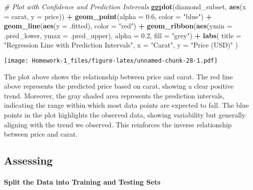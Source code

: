 \documentclass[
]{article}
\newenvironment{Shaded}{\begin{snugshade}}{\end{snugshade}}
\newcommand{\AttributeTok}[1]{\textcolor[rgb]{0.13,0.29,0.53}{#1}}
\newcommand{\CommentTok}[1]{\textcolor[rgb]{0.56,0.35,0.01}{\textit{#1}}}
\newcommand{\FloatTok}[1]{\textcolor[rgb]{0.00,0.00,0.81}{#1}}
\newcommand{\FunctionTok}[1]{\textcolor[rgb]{0.13,0.29,0.53}{\textbf{#1}}}
\newcommand{\NormalTok}[1]{#1}
\newcommand{\SpecialCharTok}[1]{\textcolor[rgb]{0.81,0.36,0.00}{\textbf{#1}}}
\newcommand{\StringTok}[1]{\textcolor[rgb]{0.31,0.60,0.02}{#1}}
\begin{document}
\begin{Shaded}
\begin{Highlighting}[]
\CommentTok{\# Plot with Confidence and Prediction Intervals}
\FunctionTok{ggplot}\NormalTok{(diamond\_subset, }\FunctionTok{aes}\NormalTok{(}\AttributeTok{x =}\NormalTok{ carat, }\AttributeTok{y =}\NormalTok{ price)) }\SpecialCharTok{+}
  \FunctionTok{geom\_point}\NormalTok{(}\AttributeTok{alpha =} \FloatTok{0.6}\NormalTok{, }\AttributeTok{color =} \StringTok{"blue"}\NormalTok{) }\SpecialCharTok{+}
  \FunctionTok{geom\_line}\NormalTok{(}\FunctionTok{aes}\NormalTok{(}\AttributeTok{y =}\NormalTok{ .fitted), }\AttributeTok{color =} \StringTok{"red"}\NormalTok{) }\SpecialCharTok{+}
  \FunctionTok{geom\_ribbon}\NormalTok{(}\FunctionTok{aes}\NormalTok{(}\AttributeTok{ymin =}\NormalTok{ .pred\_lower, }\AttributeTok{ymax =}\NormalTok{ .pred\_upper), }\AttributeTok{alpha =} \FloatTok{0.2}\NormalTok{, }\AttributeTok{fill =} \StringTok{"grey"}\NormalTok{) }\SpecialCharTok{+}
  \FunctionTok{labs}\NormalTok{(}
    \AttributeTok{title =} \StringTok{"Regression Line with Prediction Intervals"}\NormalTok{,}
    \AttributeTok{x =} \StringTok{"Carat"}\NormalTok{,}
    \AttributeTok{y =} \StringTok{"Price (USD)"}
\NormalTok{  )}
\end{Highlighting}
\end{Shaded}

\texttt{[image: Homework-1\_files/figure-latex/unnamed-chunk-28-1.pdf]}

The plot above shows the relationship between price and carat. The red
line above represents the predicted price based on carat, showing a
clear positive trend. Moreover, the gray shaded area represents the
prediction intervals, indicating the range within which most data points
are expected to fall. The blue points in the plot highlights the
observed data, showing variability but generally aligning with the trend
we observed. This reinforces the inverse relationship between price and
carat.

\subsection{Assessing}\label{assessing-1}

\paragraph{Split the Data into Training and Testing
Sets}\label{split-the-data-into-training-and-testing-sets}
\end{document}
